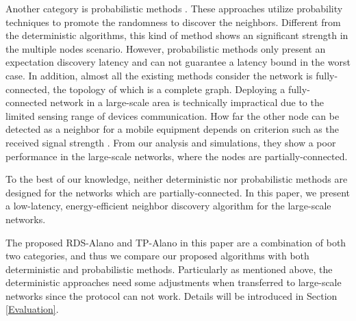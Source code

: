Another category is probabilistic methods \cite{mcglynn2001birthday,
vasudevan2009neighbor,you2011aloha,song2014probabilistic}. These
approaches utilize probability techniques to promote the randomness 
to discover the neighbors. Different from the deterministic algorithms, 
this kind of method shows an significant strength in the multiple nodes scenario. 
However, probabilistic methods only present an expectation discovery latency and 
can not guarantee a latency bound in the worst case.
In addition, almost all the existing methods consider the network is fully-connected,
the topology of which is a complete graph. Deploying a fully-connected network 
in a large-scale area is technically impractical 
due to the limited sensing range of devices communication.
How far the other node can be detected as a neighbor for a mobile equipment  
depends on criterion such as the received signal strength \cite{daiya2011experimental}.
From our analysis and simulations, 
they show a poor performance in the large-scale networks, where the nodes are
partially-connected.

To the best of our knowledge, neither deterministic nor probabilistic methods are designed for
the networks which are partially-connected. In this paper, we present a low-latency, energy-efficient 
neighbor discovery algorithm for the large-scale networks.

The proposed RDS-Alano and TP-Alano in this paper are a combination of both two categories,
and thus we compare our proposed algorithms with both deterministic and probabilistic methods. 
Particularly as mentioned above, the deterministic approaches need some adjustments 
when transferred to large-scale networks since the protocol can not work. 
Details will be introduced in Section \ref{Evaluation}.




